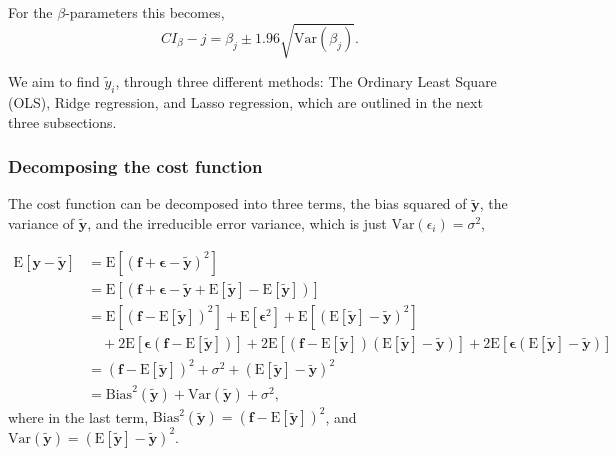 \documentclass[a4paper,10pt,english]{article}
\begin{document}
For the $\beta$-parameters this becomes,
\begin{equation}
CI_\beta-j= \beta_j \pm 1.96\sqrt{\mathrm{Var}(\beta_j)}.
\end{equation}

We aim to find $\tilde y_i$, through three different methods: The Ordinary Least Square (OLS), Ridge regression, and Lasso regression, which are outlined in the next three subsections.


\subsubsection{Decomposing the cost function}

The cost function can be decomposed into three terms, the bias squared of $\bm{{\tilde y}}$, the variance of $\bm{{\tilde y}}$, and the irreducible error variance, which is just $\mathrm{Var}(\epsilon_i)=\sigma^2$,

\begin{align*}
\mathrm{{E}}[\bm{{y}}-\bm{{\tilde y}}] &= \mathrm{{E}}[(\bm{{f}} + \bm{{\epsilon}} - \bm{{\tilde y}})^2]\\
	&= \mathrm{{E}}[(\bm{{f}}+\bm{{\epsilon}} - \bm{{\tilde y}} + \mathrm{{E}}[\bm{{\tilde y}}] - \mathrm{{E}}[\bm{{\tilde y}}])]\\
	&= \mathrm{{E}}[(\bm{{f}} - \mathrm{{E}}[\bm{{\tilde y}}])^2] + \mathrm{{E}}[\bm{{\epsilon}}^2] + \mathrm{{E}}[(\mathrm{{E}}[\bm{{\tilde y}}]-\bm{{\tilde y}})^2]\\
	 &\hspace{1em} + 2\mathrm{{E}}[\bm{{\epsilon}}(\bm{{f}}-\mathrm{{E}}[\bm{{\tilde y}}])] + 2\mathrm{{E}}[(\bm{{f}} - \mathrm{{E}}[\bm{{\tilde y}}])(\mathrm{{E}}[\bm{{\tilde y}}]-\bm{{\tilde y}})] + 2\mathrm{{E}}[\bm{{\epsilon}}(\mathrm{{E}}[\bm{{\tilde y}}]- \bm{{\tilde y}})]\\
	 &= (\bm{{f}} - \mathrm{{E}}[\bm{{\tilde y}}])^2 + \sigma^2 + (\mathrm{{E}}[\bm{{\tilde y}}]-\bm{{\tilde y}})^2\\
	 &= \mathrm{Bias}^2(\bm{{\tilde y}}) + \mathrm{Var}(\bm{{\tilde y}}) + \sigma^2,
\end{align*}
where in the last term, $\mathrm{Bias}^2(\bm{{\tilde y}}) = (\bm{{f}} - \mathrm{{E}}[\bm{{\tilde y}}])^2$, and $\mathrm{Var}(\bm{{\tilde y}}) = (\mathrm{{E}}[\bm{{\tilde y}}]-\bm{{\tilde y}})^2$.
\end{document}
